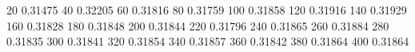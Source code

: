 20	0.31475
40	0.32205
60	0.31816
80	0.31759
100	0.31858
120	0.31916
140	0.31929
160	0.31828
180	0.31848
200	0.31844
220	0.31796
240	0.31865
260	0.31884
280	0.31835
300	0.31841
320	0.31854
340	0.31857
360	0.31842
380	0.31864
400	0.31864
